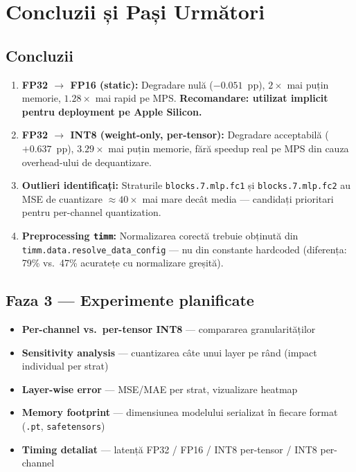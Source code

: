 \documentclass[12pt,a4paper]{article}
\begin{document}
\section{Concluzii și Pași Următori}

\subsection{Concluzii}

\begin{enumerate}
  \item \textbf{FP32 $\to$ FP16 (static):} Degradare nulă ($-0.051$~pp),
    $2\times$ mai puțin memorie, $1.28\times$ mai rapid pe MPS.
    \textbf{Recomandare: utilizat implicit pentru deployment pe Apple Silicon.}

  \item \textbf{FP32 $\to$ INT8 (weight-only, per-tensor):} Degradare acceptabilă
    ($+0.637$~pp), $3.29\times$ mai puțin memorie, fără speedup real pe MPS din
    cauza overhead-ului de dequantizare.

  \item \textbf{Outlieri identificați:} Straturile \texttt{blocks.7.mlp.fc1} și
    \texttt{blocks.7.mlp.fc2} au MSE de cuantizare $\approx 40\times$ mai mare
    decât media --- candidați prioritari pentru per-channel quantization.

  \item \textbf{Preprocessing \texttt{timm}:} Normalizarea corectă trebuie obținută
    din \texttt{timm.data.resolve\_data\_config} --- nu din constante hardcoded
    (diferența: 79\% vs.\ 47\% acuratețe cu normalizare greșită).
\end{enumerate}

\subsection{Faza 3 --- Experimente planificate}

\begin{itemize}
  \item \textbf{Per-channel vs.\ per-tensor INT8} --- compararea granularităților
  \item \textbf{Sensitivity analysis} --- cuantizarea câte unui layer pe rând
    (impact individual per strat)
  \item \textbf{Layer-wise error} --- MSE/MAE per strat, vizualizare heatmap
  \item \textbf{Memory footprint} --- dimensiunea modelului serializat în fiecare format
    (\texttt{.pt}, \texttt{safetensors})
  \item \textbf{Timing detaliat} --- latență FP32 / FP16 / INT8 per-tensor /
    INT8 per-channel
\end{itemize}
\end{document}
